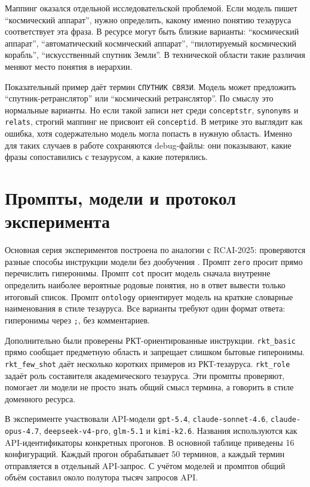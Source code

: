 \documentclass[12pt,a4paper,oneside,openany]{report}
\begin{document}
Маппинг оказался отдельной исследовательской проблемой. Если модель пишет ``космический аппарат'', нужно определить, какому именно понятию тезауруса соответствует эта фраза. В ресурсе могут быть близкие варианты: ``космический аппарат'', ``автоматический космический аппарат'', ``пилотируемый космический корабль'', ``искусственный спутник Земли''. В технической области такие различия меняют место понятия в иерархии.

Показательный пример даёт термин \texttt{СПУТНИК СВЯЗИ}. Модель может предложить ``спутник-ретранслятор'' или ``космический ретранслятор''. По смыслу это нормальные варианты. Но если такой записи нет среди \texttt{conceptstr}, \texttt{synonyms} и \texttt{relats}, строгий маппинг не присвоит ей \texttt{conceptid}. В метрике это выглядит как ошибка, хотя содержательно модель могла попасть в нужную область. Именно для таких случаев в работе сохраняются debug-файлы: они показывают, какие фразы сопоставились с тезаурусом, а какие потерялись.

\section{Промпты, модели и протокол эксперимента}

Основная серия экспериментов построена по аналогии с RCAI-2025: проверяются разные способы инструкции модели без дообучения \cite{rcai2025}. Промпт \texttt{zero} просит прямо перечислить гиперонимы. Промпт \texttt{cot} просит модель сначала внутренне определить наиболее вероятные родовые понятия, но в ответ вывести только итоговый список. Промпт \texttt{ontology} ориентирует модель на краткие словарные наименования в стиле тезауруса. Все варианты требуют один формат ответа: гиперонимы через \texttt{;}, без комментариев.

Дополнительно были проверены РКТ-ориентированные инструкции. \texttt{rkt\_basic} прямо сообщает предметную область и запрещает слишком бытовые гиперонимы. \texttt{rkt\_few\_shot} даёт несколько коротких примеров из РКТ-тезауруса. \texttt{rkt\_role} задаёт роль составителя академического тезауруса. Эти промпты проверяют, помогает ли модели не просто знать общий смысл термина, а говорить в стиле доменного ресурса.

В эксперименте участвовали API-модели \texttt{gpt-5.4}, \texttt{claude-sonnet-4.6}, \texttt{claude-opus-4.7}, \texttt{deepseek-v4-pro}, \texttt{glm-5.1} и \texttt{kimi-k2.6}. Названия используются как API-идентификаторы конкретных прогонов. В основной таблице приведены 16 конфигураций. Каждый прогон обрабатывает 50 терминов, а каждый термин отправляется в отдельный API-запрос. С учётом моделей и промптов общий объём составил около полутора тысяч запросов API.
\end{document}

